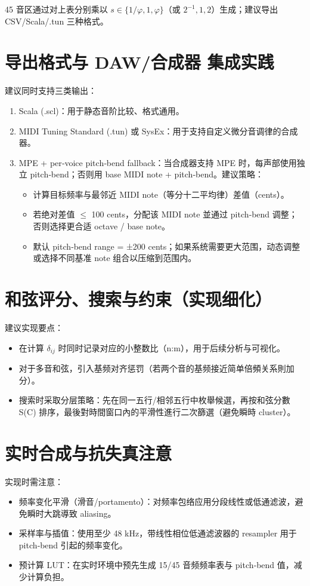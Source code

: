 \documentclass{article}
\begin{document}
45 音区通过对上表分别乘以 $s\in\{1/\varphi,1,\varphi\}$（或 $2^{-1},1,2$）生成；建议导出 CSV/Scala/.tun 三种格式。

\section{导出格式与 DAW/合成器 集成实践}
建议同时支持三类输出：
\begin{enumerate}
  \item Scala (.scl)：用于静态音阶比较、格式通用。
  \item MIDI Tuning Standard (.tun) 或 SysEx：用于支持自定义微分音调律的合成器。
  \item MPE + per‑voice pitch‑bend fallback：当合成器支持 MPE 时，每声部使用独立 pitch‑bend；否则用 base MIDI note + pitch‑bend。建议策略：
    \begin{itemize}
      \item 计算目标频率与最邻近 MIDI note（等分十二平均律）差值（cents）。
      \item 若绝对差值 $\le$ 100 cents，分配该 MIDI note 並通过 pitch‑bend 调整；否则选择更合适 octave / base note。
      \item 默认 pitch‑bend range = ±200 cents；如果系统需要更大范围，动态调整或选择不同基准 note 组合以压缩到范围内。
    \end{itemize}
\end{enumerate}

\section{和弦评分、搜索与约束（实现细化）}
建议实现要点：
\begin{itemize}
  \item 在计算 $\delta_{ij}$ 时同时记录对应的小整数比（n:m），用于后续分析与可视化。
  \item 对于多音和弦，引入基频对齐惩罚（若两个音的基频接近简单倍頻关系則加分）。
  \item 搜索时采取分层策略：先在同一五行/相邻五行中枚舉候選，再按和弦分數 S(C) 排序，最後對時間窗口內的平滑性進行二次篩選（避免瞬時 cluster）。
\end{itemize}

\section{实时合成与抗失真注意}
实现时需注意：
\begin{itemize}
  \item 频率变化平滑（滑音/portamento）：对频率包络应用分段线性或低通滤波，避免瞬时大跳導致 aliasing。
  \item 采样率与插值：使用至少 48 kHz，带线性相位低通滤波器的 resampler 用于 pitch‑bend 引起的频率变化。
  \item 预计算 LUT：在实时环境中预先生成 15/45 音频频率表与 pitch‑bend 值，减少计算负担。
\end{itemize}
\end{document}
